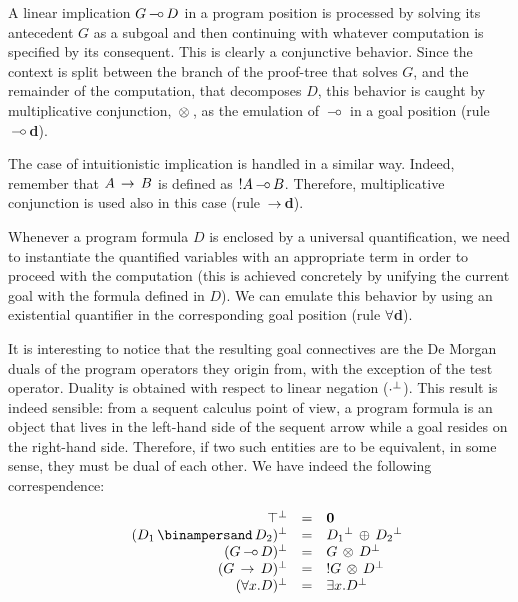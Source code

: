 A linear implication $G \, \mbox{$-\!\circ$} \, D$ in a program position is processed by
solving its antecedent $G$ as a subgoal and then continuing with whatever
computation is specified by its consequent. This is clearly a conjunctive
behavior. Since the context is split between the branch of the proof-tree
that solves $G$, and the remainder of the computation, that decomposes $D$,
this behavior is caught by multiplicative conjunction, $\, \otimes \,$, as the
emulation of $\, \mbox{$-\!\circ$} \,$ in a goal position (rule {\bf $\, \mbox{$-\!\circ$} \,$d}).

The case of intuitionistic implication is handled in a similar way. Indeed,
remember that $A \, \rightarrow \, B$ is defined as $!A \, \mbox{$-\!\circ$} \, B$. Therefore,
multiplicative conjunction is used also in this case (rule {\bf $\, \rightarrow \,$d}).

Whenever a program formula $D$ is enclosed by a universal quantification, we
need to instantiate the quantified variables with an appropriate term in
order to proceed with the computation (this is achieved concretely by
unifying the current goal with the formula defined in $D$). We can emulate
this behavior by using an existential quantifier in the corresponding goal
position (rule {\bf $\forall$d}).

It is interesting to notice that the resulting goal connectives are the De
Morgan duals of the program operators they origin from, with the exception of
the test operator. Duality is obtained with respect to linear negation
($\cdot{^\bot}$). This result is indeed sensible: from a sequent calculus point
of view, a program formula is an object that lives in the left-hand side of
the sequent arrow while a goal resides on the right-hand side. Therefore, if
two such entities are to be equivalent, in some sense, they must be dual of
each other. We have indeed the following correspendence:

$$\begin{array}{rrcll}
  & \Top\Nil
  & =
  & \Zero
\\
  & (D_1 \With D_2)\Nil
  & =
  & D_1\Nil \Plus D_2\Nil
\\
  & (G \Lolli D)\Nil
  & =
  & G \Times D\Nil
\\
  & (G \Imp D)\Nil
  & =
  & !G \Times D\Nil
\\
  & (\A x. D)\Nil
  & =
  & \E x. D\Nil
\end{array}$$




